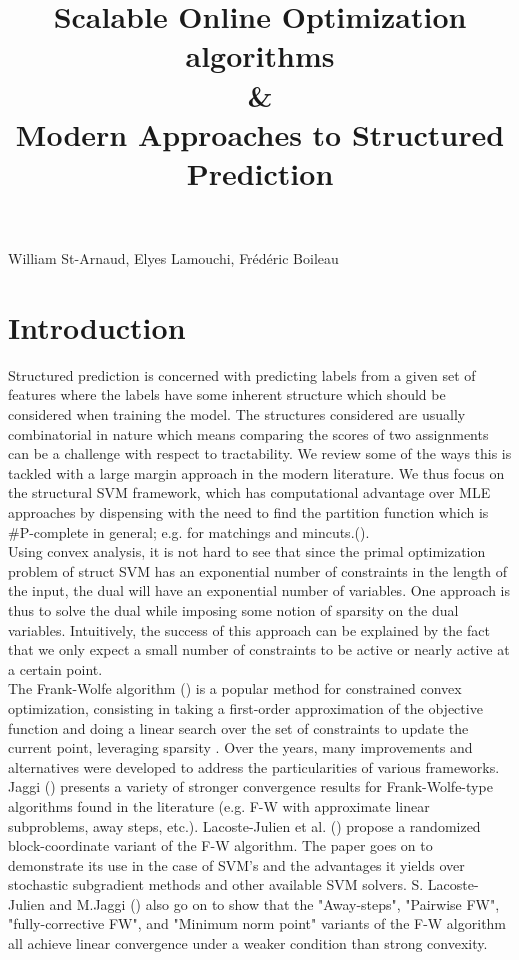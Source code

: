 \documentclass{article}
\title{Scalable Online Optimization algorithms\\ \& \\ Modern Approaches to Structured
Prediction}
\date{}
\begin{document}
 

\maketitle


\vspace{-0.5in}
\begin{center}
William St-Arnaud, Elyes Lamouchi, Fr\'ed\'eric Boileau
\end{center}
\vspace{0.2in}


\section*{Introduction}

Structured prediction is concerned with predicting labels from a given
set of features where the labels have some inherent structure which should
be considered when training the model. The structures considered are usually
combinatorial in nature which means comparing the scores of two assignments
can be a challenge with respect to tractability. We review some of the ways
this is tackled with a large margin approach in the modern literature.
We thus focus on the structural SVM framework, which has computational
advantage over MLE approaches by dispensing with the need to find the
partition function which is \#P-complete in general; e.g. for
matchings and mincuts.(\cite{dualextraSimon}).\\

Using convex analysis, it is not hard to see that since the primal optimization
problem of struct SVM has an exponential number of constraints in the length of
the input, the dual will have an exponential number of variables. One approach is
thus to solve the dual while imposing some notion of sparsity on the dual
variables. Intuitively, the success of this approach can be explained by the fact
that we only expect a small number of constraints to be active or nearly active
at a certain point. \\

The Frank-Wolfe algorithm (\cite{f-w}) is a popular method for constrained
convex optimization, consisting in taking a first-order approximation of the
objective function and doing a linear search over the set of constraints to
update the current point, leveraging sparsity . Over the years, many
improvements and alternatives were developed to address the particularities of
various frameworks. Jaggi (\cite{Jaggi:229246}) presents a variety of stronger
convergence results for Frank-Wolfe-type algorithms found in the literature
(e.g. F-W with approximate linear subproblems, away steps, etc.). Lacoste-Julien
et al. (\cite{dualextraSimon}) propose a randomized block-coordinate variant of
the F-W algorithm. The paper goes on to demonstrate its use in the case of SVM's
and the advantages it yields over stochastic subgradient methods and other
available SVM solvers. S. Lacoste-Julien and M.Jaggi
(\cite{2015arXiv151105932L}) also go on to show that the "Away-steps", "Pairwise
FW", "fully-corrective FW", and "Minimum norm point" variants of the F-W
algorithm all achieve linear convergence under a weaker condition than strong
convexity.\\
\end{document}
